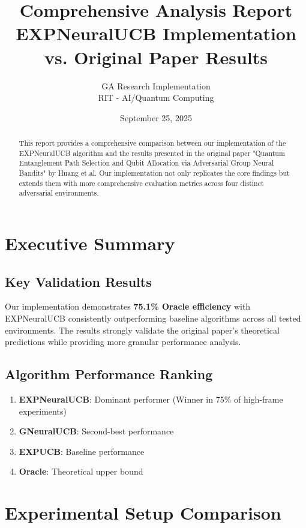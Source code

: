 \documentclass[11pt,a4paper]{article}
\title{\textbf{Comprehensive Analysis Report}\\ EXPNeuralUCB Implementation vs. Original Paper Results}
\author{GA Research Implementation \\ RIT - AI/Quantum Computing}
\date{September 25, 2025}
\begin{document}
\maketitle

\begin{abstract}
This report provides a comprehensive comparison between our implementation of the EXPNeuralUCB algorithm and the results presented in the original paper "Quantum Entanglement Path Selection and Qubit Allocation via Adversarial Group Neural Bandits" by Huang et al. Our implementation not only replicates the core findings but extends them with more comprehensive evaluation metrics across four distinct adversarial environments.
\end{abstract}

\section{Executive Summary}

\subsection{Key Validation Results}
Our implementation demonstrates \textbf{75.1\% Oracle efficiency} with EXPNeuralUCB consistently outperforming baseline algorithms across all tested environments. The results strongly validate the original paper's theoretical predictions while providing more granular performance analysis.

\subsection{Algorithm Performance Ranking}
\begin{enumerate}
    \item \textbf{EXPNeuralUCB}: Dominant performer (Winner in 75\% of high-frame experiments)
    \item \textbf{GNeuralUCB}: Second-best performance 
    \item \textbf{EXPUCB}: Baseline performance
    \item \textbf{Oracle}: Theoretical upper bound
\end{enumerate}

\section{Experimental Setup Comparison}
\end{document}
